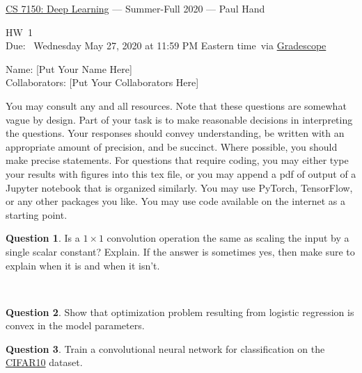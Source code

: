 \documentclass[11pt]{article}
\newcommand{\yourname}{[Put Your Name Here]}
\newcommand{\yourcollaborators}{[Put Your Collaborators Here]}
\theoremstyle{definition}
\newcommand{\instructor}{Paul Hand}
\newcommand{\hwnum}{1}
\newcommand{\hwdue}{Wednesday May 27, 2020 at 11:59 PM Eastern time}
\theoremstyle{theorem}
\newtheorem{ques}{Question}
\newcommand{\response}{\medskip\noindent{\color{DarkBlue}\textbf{Response:}}}
\begin{document}
{\Large 
\begin{center}\href{http://khoury.northeastern.edu/home/hand/teaching/cs7150-summer-2020/index.html}{CS 7150: Deep Learning} --- Summer-Full 2020 --- \instructor \end{center}}
{\large
\vspace{10pt}
\noindent HW~\hwnum\  \vspace{2pt}\\
Due: ~\hwdue \ via \href{https://www.gradescope.com/courses/127111}{Gradescope}}

\bigskip
{\large
\noindent Name: \yourname \vspace{2pt}\\ Collaborators: \yourcollaborators}

\vspace{15pt}

\noindent You may consult any and all resources.  Note that these questions are somewhat vague by design.  Part of your task is to make reasonable decisions in interpreting the questions.  Your responses should convey understanding, be written with an appropriate amount of precision, and be succinct.  Where possible, you should make precise statements.  For questions that require coding, you may either type your results with figures into this tex file, or you may append a pdf of output of a Jupyter notebook that is organized similarly.  You may use PyTorch, TensorFlow, or any other packages you like.   You may use code available on the internet as a starting point.



\begin{ques} Is a $1 \times 1$ convolution operation the same as scaling the input by a single scalar constant?  Explain.  If the answer is sometimes yes, then make sure to explain when it is and when it isn't.
\end{ques}
\response

\ 

\begin{ques} 
Show that optimization problem resulting from logistic regression is convex in the model parameters.
\end{ques}
\response

\begin{ques} 
Train a convolutional neural network for classification on the \href{https://www.cs.toronto.edu/~kriz/cifar.html}{CIFAR10} dataset.
\end{ques}
\end{document}
